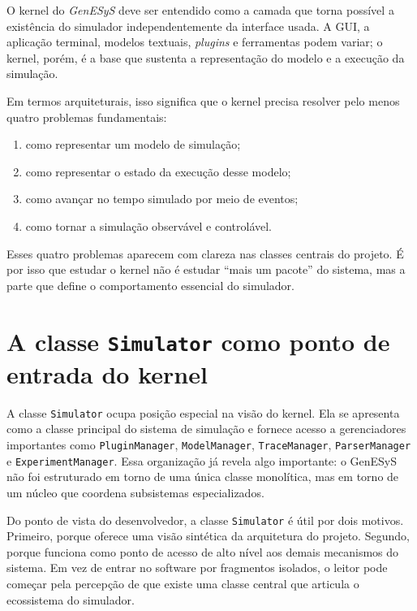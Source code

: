 O kernel do \textit{GenESyS} deve ser entendido como a camada que torna possível a existência do simulador independentemente da interface usada. A GUI, a aplicação terminal, modelos textuais, \textit{plugins} e ferramentas podem variar; o kernel, porém, é a base que sustenta a representação do modelo e a execução da simulação.

Em termos arquiteturais, isso significa que o kernel precisa resolver pelo menos quatro problemas fundamentais:

\begin{enumerate}
    \item como representar um modelo de simulação;
    \item como representar o estado da execução desse modelo;
    \item como avançar no tempo simulado por meio de eventos;
    \item como tornar a simulação observável e controlável.
\end{enumerate}

Esses quatro problemas aparecem com clareza nas classes centrais do projeto. É por isso que estudar o kernel não é estudar ``mais um pacote'' do sistema, mas a parte que define o comportamento essencial do simulador.

\section{A classe \texttt{Simulator} como ponto de entrada do kernel}
\label{sec:cap7_classe_simulator}

A classe \texttt{Simulator} ocupa posição especial na visão do kernel. Ela se apresenta como a classe principal do sistema de simulação e fornece acesso a gerenciadores importantes como \texttt{PluginManager}, \texttt{ModelManager}, \texttt{TraceManager}, \texttt{ParserManager} e \texttt{ExperimentManager}. Essa organização já revela algo importante: o GenESyS não foi estruturado em torno de uma única classe monolítica, mas em torno de um núcleo que coordena subsistemas especializados.

Do ponto de vista do desenvolvedor, a classe \texttt{Simulator} é útil por dois motivos. Primeiro, porque oferece uma visão sintética da arquitetura do projeto. Segundo, porque funciona como ponto de acesso de alto nível aos demais mecanismos do sistema. Em vez de entrar no software por fragmentos isolados, o leitor pode começar pela percepção de que existe uma classe central que articula o ecossistema do simulador.


